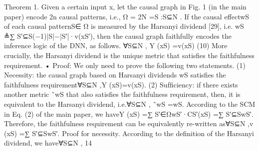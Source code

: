 Theorem 1. Given a certain input x, let the causal graph in Fig. 1 (in the main paper) encode 2n causal patterns, i.e.,
Ω = 2N ={S :S⊆N} . If the causal effectwS of each causal patternS∈ Ω is measured by the Harsanyi dividend [29], i.e.
wS ≜∑
S′⊆S(−1)|S|−|S′|·v(xS′), then the causal graph faithfully encodes the inference logic of the DNN, as follows.
∀S⊆N , Y (xS) =v(xS) (10)
More crucially, the Harsanyi dividend is the unique metric that satisﬁes the faithfulness requirement.
• Proof: We only need to prove the following two statements. (1) Necessity: the causal graph based on Harsanyi dividends
wS satisﬁes the faithfulness requirement∀S⊆N ,Y (xS)=v(xS). (2) Sufﬁciency: if there exists another metric ˜wS that also
satisﬁes the faithfulness requirement, then, it is equivalent to the Harsanyi dividend, i.e.∀S⊆N , ˜wS =wS.
According to the SCM in Eq. (2) of the main paper, we haveY (xS) =∑
S′∈ΩwS′·CS′(xS) =∑
S′⊆SwS′. Therefore, the
faithfulness requirement can be equivalently re-written as∀S⊆N ,v (xS) =∑
S′⊆SwS′.
Proof for necessity. According to the deﬁnition of the Harsanyi dividend, we have∀S⊆N ,
14
